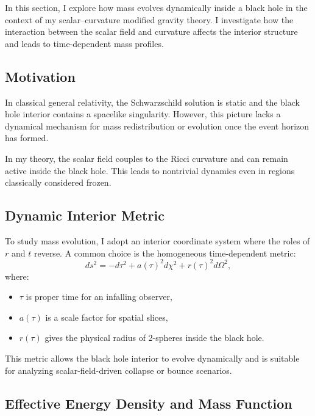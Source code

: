 \documentclass[12pt]{article}
\begin{document}
In this section, I explore how mass evolves dynamically inside a black hole in the context of my scalar--curvature modified gravity theory. I investigate how the interaction between the scalar field and curvature affects the interior structure and leads to time-dependent mass profiles.

\subsection{Motivation}

In classical general relativity, the Schwarzschild solution is static and the black hole interior contains a spacelike singularity. However, this picture lacks a dynamical mechanism for mass redistribution or evolution once the event horizon has formed.

In my theory, the scalar field couples to the Ricci curvature and can remain active inside the black hole. This leads to nontrivial dynamics even in regions classically considered frozen.

\subsection{Dynamic Interior Metric}

To study mass evolution, I adopt an interior coordinate system where the roles of \( r \) and \( t \) reverse. A common choice is the homogeneous time-dependent metric:
\begin{equation}
ds^2 = -d\tau^2 + a(\tau)^2 d\chi^2 + r(\tau)^2 d\Omega^2,
\label{eq:interior_metric}
\end{equation}
where:
\begin{itemize}
    \item \( \tau \) is proper time for an infalling observer,
    \item \( a(\tau) \) is a scale factor for spatial slices,
    \item \( r(\tau) \) gives the physical radius of 2-spheres inside the black hole.
\end{itemize}

This metric allows the black hole interior to evolve dynamically and is suitable for analyzing scalar-field-driven collapse or bounce scenarios.

\subsection{Effective Energy Density and Mass Function}
\end{document}
